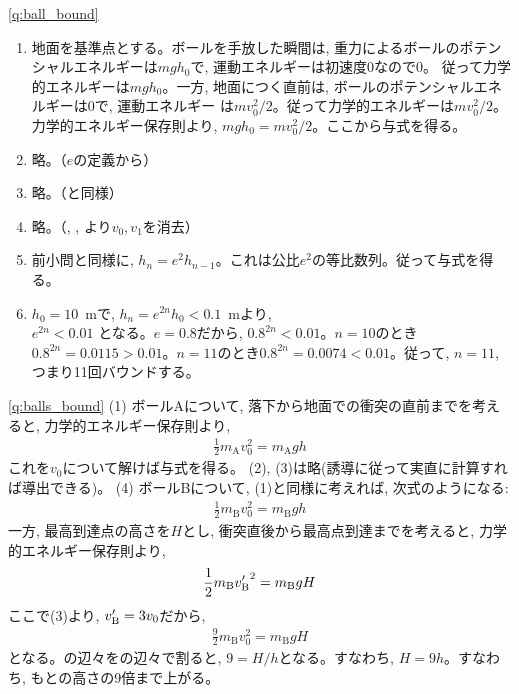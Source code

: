 \ref{q:ball_bound}
\begin{enumerate}
\item 地面を基準点とする。ボールを手放した瞬間は, 重力によるボールのポテンシャルエネルギーは$mgh_0$で, 運動エネルギーは初速度0なので$0$。
従って力学的エネルギーは$mgh_0$。一方, 地面につく直前は, ボールのポテンシャルエネルギーは$0$で, 運動エネルギー
は$mv_0^2/2$。従って力学的エネルギーは$mv_0^2/2$。力学的エネルギー保存則より, $mgh_0=mv_0^2/2$。ここから与式を得る。
\item 略。（$e$の定義から）
\item 略。（と同様）
\item 略。（, , より$v_0, v_1$を消去）
\item 前小問と同様に, $h_n=e^2h_{n-1}$。これは公比$e^2$の等比数列。従って与式を得る。
\item $h_0=10$~mで, $h_n=e^{2n}h_0<0.1$~mより, \\
$e^{2n}<0.01$
となる。$e=0.8$だから, $0.8^{2n}<0.01$。$n=10$のとき
$0.8^{2n}=0.0115>0.01$。$n=11$のとき$0.8^{2n}=0.0074<0.01$。従って, $n=11$, つまり11回バウンドする。
\end{enumerate}
\vspace{0.2cm}


%
\ref{q:balls_bound}
(1) ボールAについて, 落下から地面での衝突の直前までを考えると, 力学的エネルギー保存則より, 
\begin{eqnarray}
\frac{1}{2}m_{\text{A}}v_0^2=m_{\text{A}}gh\label{eq:balls_bound_ans2}
\end{eqnarray}
これを$v_0$について解けば与式を得る。\mv
(2), (3)は略(誘導に従って実直に計算すれば導出できる)。\mv
(4) ボールBについて, (1)と同様に考えれば, 次式のようになる: 
\begin{eqnarray}
\frac{1}{2}m_{\text{B}}v_0^2=m_{\text{B}}gh\label{eq:balls_bound_ans3}
\end{eqnarray}
一方, 最高到達点の高さを$H$とし, 衝突直後から最高点到達までを考えると, 力学的エネルギー保存則より, 
\begin{eqnarray*}
\frac{1}{2}m_{\text{B}}{v'_{\text B}}^2=m_{\text{B}}gH
\end{eqnarray*}
ここで(3)より, $v'_{\text B}=3v_0$だから, 
\begin{eqnarray}
\frac{9}{2}m_{\text{B}}v_0^2=m_{\text{B}}gH\label{eq:balls_bound_ans4}
\end{eqnarray}
となる。の辺々をの辺々で割ると, 
$9=H/h$となる。すなわち, $H=9h$。すなわち, もとの高さの9倍まで上がる。
\mv


